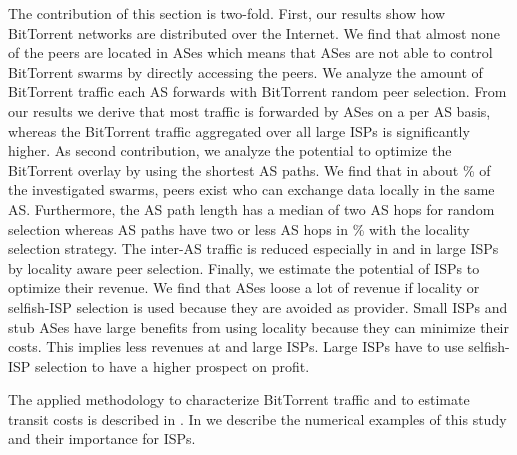 The contribution of this section is two-fold.
First, our results show how BitTorrent networks are distributed over the Internet. We find that almost none of the peers are located in \tier ASes which means that \tier ASes are not able to control BitTorrent swarms by directly accessing the peers. We analyze the amount of BitTorrent traffic each AS forwards with BitTorrent random peer selection. From our results we derive that most traffic is forwarded by \tier ASes on a per AS basis, whereas the BitTorrent traffic aggregated over all large ISPs is significantly higher. As second contribution, we analyze the potential to optimize the BitTorrent overlay by using the shortest AS paths. We find that in about \unit[15]{\%} of the investigated swarms, peers exist who can exchange data locally in the same AS.
Furthermore, the AS path length has a median of two AS hops for random selection whereas AS paths have two or less AS hops in \unit[80]{\%} with the locality selection strategy. The inter-AS traffic is reduced especially in \tier and in large ISPs by locality aware peer selection. Finally, we estimate the potential of ISPs to optimize their revenue. We find that \tier ASes loose a lot of revenue if locality or selfish-ISP selection is used because they are avoided as provider. Small ISPs and stub ASes have large benefits from using locality because they can minimize their costs. This implies less revenues at \tier and large ISPs. Large ISPs have to use selfish-ISP selection to have a higher prospect on profit.

The applied methodology to characterize BitTorrent traffic and to estimate transit costs is described in . In  we describe the numerical examples of this study and their importance for ISPs.



